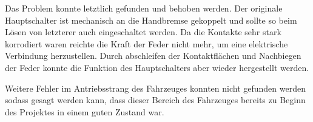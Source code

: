 Das Problem konnte letztlich gefunden und behoben werden. Der originale Hauptschalter ist mechanisch an die Handbremse gekoppelt und sollte so beim Lösen von letzterer auch eingeschaltet werden. Da die Kontakte sehr stark korrodiert waren reichte die Kraft der Feder nicht mehr, um eine elektrische Verbindung herzustellen. Durch abschleifen der Kontaktflächen und Nachbiegen der Feder konnte die Funktion des Hauptschalters aber wieder hergestellt werden.

Weitere Fehler im Antriebsstrang des Fahrzeuges konnten nicht gefunden werden sodass gesagt werden kann, dass dieser Bereich des Fahrzeuges bereits zu Beginn des Projektes in einem guten Zustand war.




\newpage